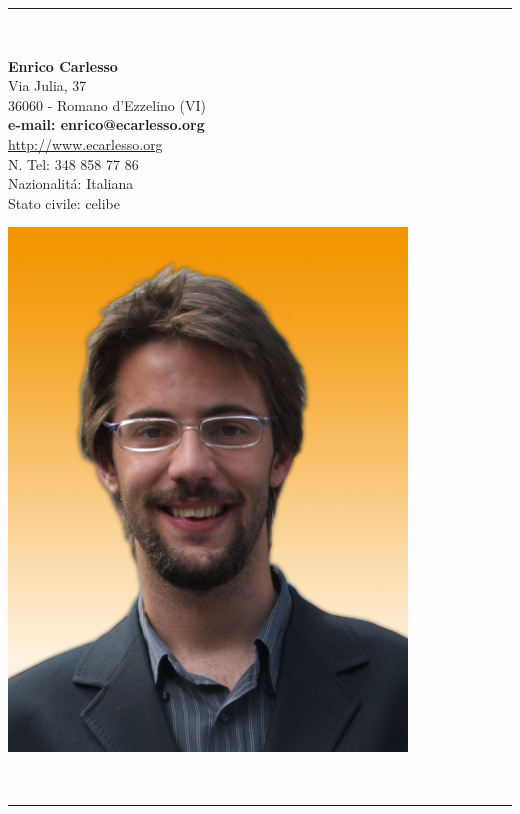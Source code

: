 \documentclass[pdftex, a4paper, 11pt]{article}
\begin{document}
\vspace*{.3cm}
\begin{center}
  \rule{.8\textwidth}{1pt}\\[10pt]
  \begin{minipage}{.55\textwidth}
    \LARGE\textbf{Enrico Carlesso}\\[13pt]
    \small Via Julia, 37\\
    36060 - Romano d'Ezzelino (VI)\\[6pt]
    \textbf{e-mail: enrico@ecarlesso.org}\\
    \small \url{http://www.ecarlesso.org}\\
    \small N. Tel: 348 858 77 86\\[6pt]
    \small Nazionalit\'a: Italiana\\
    \small Stato civile: celibe\\
  \end{minipage}
  \begin{minipage}{.2\textwidth}
    \includegraphics[width=\textwidth]{foto.png}
  \end{minipage}\\[5pt]
  \rule{.8\textwidth}{1pt}
\end{center}
\vspace*{1cm}
\end{document}
